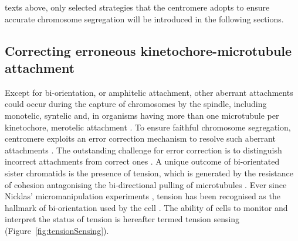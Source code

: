 texts above, only selected strategies that the centromere adopts to ensure accurate chromosome segregation will be introduced in the following sections. 

\subsection{Correcting erroneous kinetochore-microtubule attachment}

Except for bi-orientation, or amphitelic attachment, other aberrant attachments could occur during the capture of chromosomes by the spindle, including monotelic, syntelic and, in organisms having more than one microtubule per kinetochore, merotelic attachment \citep{Tanaka2010Kinetochore-microtubuleBi-orientation}. To ensure faithful chromosome segregation, centromere exploits an error correction mechanism to resolve such aberrant attachments \citep{Tanaka2022SWAPCorrection}. The outstanding challenge for error correction is to distinguish incorrect attachments from correct ones \citep{Lampson2011SensingFunction}. A unique outcome of bi-orientated sister chromatids is the presence of tension, which is generated by the resistance of cohesion antagonising the bi-directional pulling of microtubules \citep{Nicklas1997HowChromosomes}. Ever since Nicklas' micromanipulation experiments \citep{Nicklas1969CHROMOSOMEChromosomes, Nicklas1963AMovement}, tension has been recognised as the hallmark of bi-orientation used by the cell \citep{McVey2021AuroraSegregation}. The ability of cells to monitor and interpret the status of tension is hereafter termed tension sensing (Figure~\ref{fig:tensionSensing}). 

